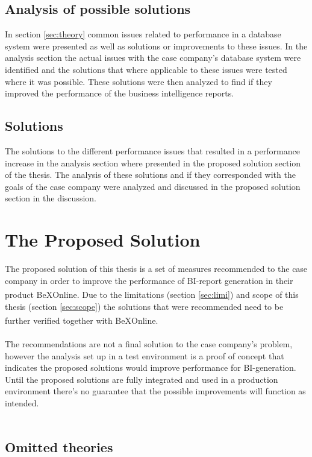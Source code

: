 \documentclass{cslthse-msc}
\newcommand{\bex}{BeX\textsuperscript{\textregistered}}
\begin{document}
\subsection{Analysis of possible solutions}
In section \ref{sec:theory} common issues related to performance in a database system were presented as well as solutions or improvements to these issues. In the analysis section the actual issues with the case company's database system were identified and the solutions that where applicable to these issues were tested where it was possible. These solutions were then analyzed to find if they improved the performance of the business intelligence reports.

\subsection{Solutions}
The solutions to the different performance issues that resulted in a performance increase in the analysis section where presented in the proposed solution section of the thesis. The analysis of these solutions and if they corresponded with the goals of the case company were analyzed and discussed in the proposed solution section in the discussion.

\section{The Proposed Solution}
The proposed solution of this thesis is a set of measures recommended to the case company in order to improve the performance of BI-report generation in their product \bex Online. Due to the limitations (section \ref{sec:limi}) and scope of this thesis (section \ref{sec:scope}) the solutions that were recommended need to be further verified together with \bex Online.\\\\
The recommendations are not a final solution to the case company's problem, however the analysis set up in a test environment is a proof of concept that indicates the proposed solutions would improve performance for BI-generation. Until the proposed solutions are fully integrated and used in a production environment there's no guarantee that the possible improvements will function as intended.\\\\

\subsection{Omitted theories}
\end{document}
